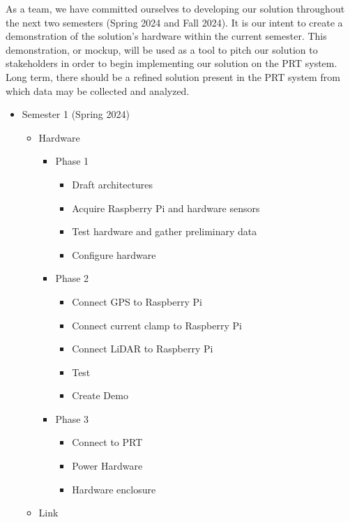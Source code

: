 As a team, we have committed ourselves to developing our solution throughout the next two semesters (Spring 2024 and Fall 2024). It is our intent to create a demonstration of the solution’s hardware within the current semester. This demonstration, or mockup, will be used as a tool to pitch our solution to stakeholders in order to begin implementing our solution on the PRT system. Long term, there should be a refined solution present in the PRT system from which data may be collected and analyzed.

\begin{itemize}
    \item Semester 1 (Spring 2024)
    \begin{itemize}
        \item Hardware
        \begin{itemize}
            \item Phase 1
            \begin{itemize}
                \item Draft architectures
                \item Acquire Raspberry Pi and hardware sensors
                \item Test hardware and gather preliminary data
                \item Configure hardware
            \end{itemize}
            \item Phase 2
            \begin{itemize}
                \item Connect GPS to Raspberry Pi
                \item Connect current clamp to Raspberry Pi
                \item Connect LiDAR to Raspberry Pi
                \item Test
                \item Create Demo                
            \end{itemize}
            \item Phase 3
            \begin{itemize}
                \item Connect to PRT
                \item Power Hardware
                \item Hardware enclosure
            \end{itemize}
        \end{itemize}
        \item Link

\end{itemize}
\end{itemize}
